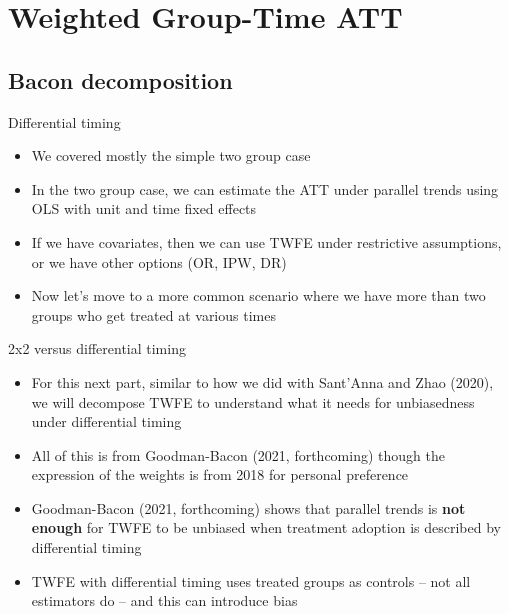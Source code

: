 \documentclass{beamer}
\begin{document}



\section{Weighted Group-Time ATT}

\subsection{Bacon decomposition}

\begin{frame}{Differential timing}

\begin{itemize}
\item We covered mostly the simple two group case
\item In the two group case, we can estimate the ATT under parallel trends using OLS with unit and time fixed effects
\item If we have covariates, then we can use TWFE under restrictive assumptions, or we have other options (OR, IPW, DR)
\item Now let's move to a more common scenario where we have more than two groups who get treated at various times
\end{itemize}

\end{frame}

\begin{frame}{2x2 versus differential timing}

\begin{itemize}
	\item For this next part, similar to how we did with Sant'Anna and Zhao (2020), we will decompose TWFE to understand what it needs for unbiasedness under differential timing
	\item All of this is from Goodman-Bacon (2021, forthcoming) though the expression of the weights is from 2018 for personal preference
	\item Goodman-Bacon (2021, forthcoming) shows that parallel trends is \textbf{not enough} for TWFE to be unbiased when treatment adoption is described by differential timing
	\item TWFE with differential timing uses treated groups as controls -- not all estimators do -- and this can introduce bias
\end{itemize}

\end{frame}
\end{document}
